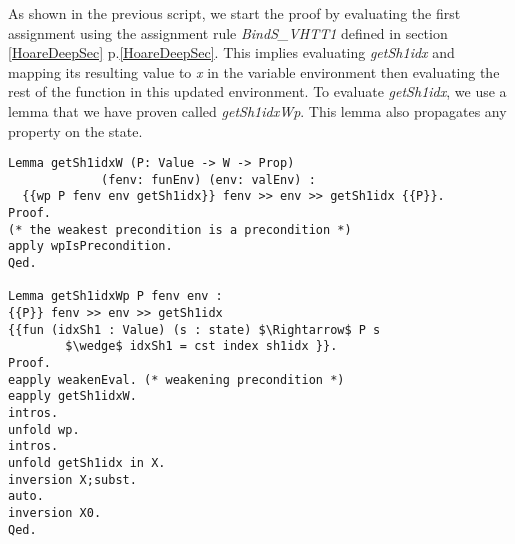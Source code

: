 As shown in the previous script, we start the proof by evaluating the first assignment using the assignment rule \textit{BindS\_VHTT1} defined in section \ref{HoareDeepSec} p.\ref{HoareDeepSec}. This implies evaluating \textit{getSh1idx} and mapping its resulting value to \textit{x} in the variable environment then evaluating the rest of the function in this updated environment. To evaluate \textit{getSh1idx}, we use a lemma that we have proven called \textit{getSh1idxWp}. This lemma also propagates any property on the state.
\begin{lstlisting}[caption = {getSh1idxWp lemma definition and proof},xleftmargin=-.06\textwidth,
xrightmargin=-.06\textwidth,mathescape=true]
Lemma getSh1idxW (P: Value -> W -> Prop) 
	         (fenv: funEnv) (env: valEnv) :
  {{wp P fenv env getSh1idx}} fenv >> env >> getSh1idx {{P}}.
Proof.
(* the weakest precondition is a precondition *)
apply wpIsPrecondition.
Qed.

Lemma getSh1idxWp P fenv env :
{{P}} fenv >> env >> getSh1idx 
{{fun (idxSh1 : Value) (s : state) $\Rightarrow$ P s  
	    $\wedge$ idxSh1 = cst index sh1idx }}.
Proof.
eapply weakenEval. (* weakening precondition *)
eapply getSh1idxW.
intros. 
unfold wp.
intros.
unfold getSh1idx in X.
inversion X;subst.
auto.
inversion X0.
Qed. 
\end{lstlisting} \vspace{4pt}

